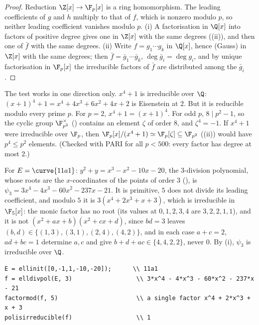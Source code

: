 \begin{proof}
Reduction $\Z[x]\to\F_p[x]$ is a ring homomorphism. The leading coefficients of $g$ and $h$ multiply to that of $f$, which is
nonzero modulo $p$, so neither leading coefficient vanishes modulo $p$. (i) A factorisation in $\Q[x]$ into factors of positive
degree gives one in $\Z[x]$ with the same degrees ((ii)), and then one of $\bar f$ with the same degrees.
(ii) Write $f=g_1\cdots g_k$ in $\Q[x]$, hence (Gauss) in $\Z[x]$ with the same degrees; then $\bar f=\bar g_1\cdots\bar g_k$, $\deg\bar g_i=\deg g_i$, and by
unique factorisation in $\F_p[x]$ the irreducible factors of $\bar f$ are distributed among the $\bar g_i$.
\end{proof}

\begin{warning}[$x^4+1$]\label{warn:rings:x4plus1}
The test works in one direction only. $x^4+1$ is irreducible over $\Q$: $(x+1)^4+1=x^4+4x^3+6x^2+4x+2$ is Eisenstein at $2$. But it is
reducible modulo every prime $p$. For $p=2$, $x^4+1=(x+1)^4$. For odd $p$, $8\mid p^2-1$, so the cyclic group $\F_{p^2}^\times$
() contains an element $\zeta$ of order $8$, and $\zeta^4=-1$. If $x^4+1$
were irreducible over $\F_p$, then $\F_p[x]/(x^4+1)\simeq\F_p[\zeta]\subseteq\F_{p^2}$ ((ii)) would have $p^4\le p^2$ elements.
(Checked with PARI for all $p<500$: every factor has degree at most $2$.)
\end{warning}

\begin{example}\label{ex:rings:psi3}
For $E=\curve{11a1}$: $y^2+y=x^3-x^2-10x-20$, the $3$-division polynomial, whose roots are the $x$-coordinates of the points of order $3$
(), is $\psi_3=3x^4-4x^3-60x^2-237x-21$. It is primitive, $5$ does not divide its leading coefficient, and modulo $5$
it is $3(x^4+2x^3+x+3)$, which is irreducible in $\F_5[x]$: the monic factor has no root (its values at $0,1,2,3,4$ are $3,2,2,1,1$), and it is not
$(x^2+ax+b)(x^2+cx+d)$, since $bd=3$ leaves $(b,d)\in\{(1,3),(3,1),(2,4),(4,2)\}$, and in each case $a+c=2$, $ad+bc=1$ determine $a,c$ and give
$b+d+ac\in\{4,4,2,2\}$, never $0$. By (i), $\psi_3$ is irreducible over $\Q$.
\begin{lstlisting}[language=GP]
E = ellinit([0,-1,1,-10,-20]);      \\ 11a1
f = elldivpol(E, 3)                  \\ 3*x^4 - 4*x^3 - 60*x^2 - 237*x - 21
factormod(f, 5)                      \\ a single factor x^4 + 2*x^3 + x + 3
polisirreducible(f)                  \\ 1
\end{lstlisting}
\end{example}


